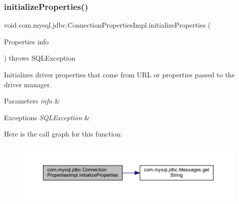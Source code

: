 \subsubsection{\texorpdfstring{initialize\+Properties()}{initializeProperties()}}
{\footnotesize\ttfamily void com.\+mysql.\+jdbc.\+Connection\+Properties\+Impl.\+initialize\+Properties (\begin{DoxyParamCaption}\item[{Properties}]{info }\end{DoxyParamCaption}) throws S\+Q\+L\+Exception\hspace{0.3cm}{\ttfamily [protected]}}

Initializes driver properties that come from U\+RL or properties passed to the driver manager.


\begin{DoxyParams}{Parameters}
{\em info} & \\
\hline
\end{DoxyParams}

\begin{DoxyExceptions}{Exceptions}
{\em S\+Q\+L\+Exception} & \\
\hline
\end{DoxyExceptions}
Here is the call graph for this function\+:\nopagebreak
\begin{figure}[H]
\begin{center}
\leavevmode
\includegraphics[width=350pt]{classcom_1_1mysql_1_1jdbc_1_1_connection_properties_impl_a5ba8ddef0c7c382545a2e14ba52596e9_cgraph}
\end{center}
\end{figure}
\mbox{\label{classcom_1_1mysql_1_1jdbc_1_1_connection_properties_impl_ae7cb9c24762dffac1851b0122c4759a8}} 
